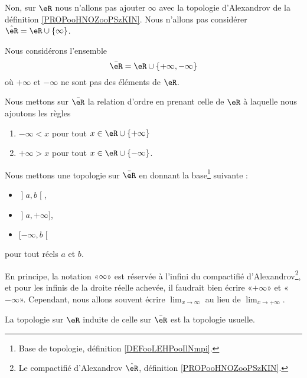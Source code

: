 Non, sur \( \eR\) nous n'allons pas ajouter \( \infty\) avec la topologie d'Alexandrov de la définition \ref{PROPooHNOZooPSzKIN}. Nous n'allons pas considérer \( \hat \eR=\eR\cup\{ \infty \}\).

\begin{definition}       \label{DEFooRUyiBSUooALDDOa}
	Nous considérons l'ensemble
	\begin{equation}
		\bar \eR=\eR\cup\{ +\infty,-\infty \}
	\end{equation}
	où \( +\infty\) et \( -\infty\) ne sont pas des éléments de \( \eR\).

	Nous mettons sur \( \bar\eR\) la relation d'ordre en prenant celle de \( \eR\) à laquelle nous ajoutons les règles
	\begin{enumerate}
		\item
		      \( -\infty<x\) pour tout \( x\in\eR\cup\{ +\infty \}\)
		\item
		      \( +\infty>x\) pour tout \( x\in \eR\cup\{-\infty  \}\).
	\end{enumerate}

	Nous mettons une topologie sur \( \bar\eR\) en donnant la base\footnote{Base de topologie, définition \ref{DEFooLEHPooIlNmpi}.} suivante :
	\begin{itemize}
		\item \( \mathopen] a , b \mathclose[\),
		\item \( \mathopen] a , +\infty \mathclose]\),
		\item \( \mathopen[ -\infty , b \mathclose[\)
	\end{itemize}
	pour tout réels \( a\) et \( b\).
\end{definition}

\begin{normaltext}
	En principe, la notation «\( \infty\)» est réservée à l'infini du compactifié d'Alexandrov\footnote{Le compactifié d'Alexandrov \( \hat \eR\), définition \ref{PROPooHNOZooPSzKIN}.}, et pour les infinis de la droite réelle achevée, il faudrait bien écrire «\( +\infty\)» et «\( -\infty\)». Cependant, nous allons souvent écrire \( \lim_{x\to \infty} \) au lieu de \( \lim_{x\to +\infty} \).
\end{normaltext}

\begin{lemma}
	La topologie sur \( \eR\) induite de celle sur \( \bar \eR\) est la topologie usuelle.
\end{lemma}


